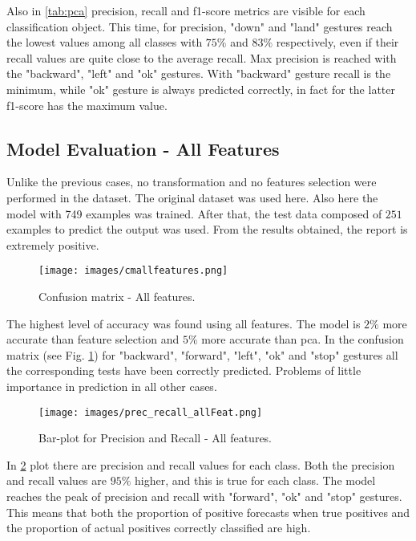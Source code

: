 \noindent Also in \ref{tab:pca} precision, recall and f1-score metrics are visible for each classification object. This time, for precision, "down" and "land" gestures reach the lowest values among all classes with $75\%$ and $83\%$ respectively, even if their recall values are quite close to the average recall. Max precision is reached with the "backward", "left" and "ok" gestures. With "backward" gesture recall is the minimum, while "ok" gesture is always predicted correctly, in fact for the latter f1-score has the maximum value.

\subsection{Model Evaluation - All Features}
\label{subsec:pcamodel}
Unlike the previous cases, no transformation and no features selection were performed in the dataset. The original dataset was used here. Also here the model with 749 examples was trained. After that, the test data composed of $251$ examples to predict the output was used. From the results obtained, the report is extremely positive.

\begin{figure}[h]
	\centering
	\texttt{[image: images/cmallfeatures.png]}
	\caption[Confusion matrix - All features.]{Confusion matrix - All features.}
	\label{fig:confallfeatures}
\end{figure}

\noindent The highest level of accuracy was found using all features. The model is $2\%$ more accurate than feature selection and $5\%$ more accurate than \gls{pca}. In the confusion matrix (see Fig. \ref{fig:confallfeatures}) for "backward", "forward", "left", "ok" and "stop" gestures all the corresponding tests have been correctly predicted. Problems of little importance in prediction in all other cases. \\

\begin{figure}[h]
	\centering
	\texttt{[image: images/prec\_recall\_allFeat.png]}
	\caption[Bar-plot for Precision and Recall - All features.]{Bar-plot for Precision and Recall - All features.}
	\label{fig:precrecallfeat}
\end{figure}

\noindent In \ref{fig:precrecallfeat} plot there are precision and recall values for each class. Both the precision and recall values are $95\%$ higher, and this is true for each class. The model reaches the peak of precision and recall with "forward", "ok" and "stop" gestures. This means that both the proportion of positive forecasts when true positives and the proportion of actual positives correctly classified are high. \\

